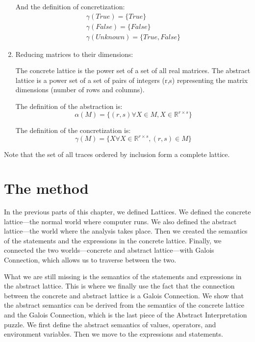 \begin{enumerate}
    And the definition of concretization:
    \begin{gather*}
        \gamma(True) = \{True\}\\
        \gamma(False) = \{False\}\\
        \gamma(Unknown) = \{True, False\}
    \end{gather*}

    \item Reducing matrices to their dimensions:

    The concrete lattice is the power set of a set of all real matrices.
    The abstract lattice is a power set of a set of pairs of integers (r,s) representing the matrix dimensions (number
    of rows and columns).

    The definition of the abstraction is:
    \[\alpha(M) = \{(r, s) \forall X \in M, X \in \mathbb{R}^{r \times s}\}\]

    The definition of the concretization is:
    \[\gamma(M) = \{X \forall X \in \mathbb{R}^{r \times s}, (r,s) \in M\}\]
\end{enumerate}

Note that the set of all traces ordered by inclusion form a complete lattice.

\section{The method} %

In the previous parts of this chapter, we defined Lattices.
We defined the concrete lattice---the normal world where computer runs.
We also defined the abstract lattice---the world where the analysis takes place.
Then we created the semantics of the statements and the expressions in the concrete lattice.
Finally, we connected the two worlds---concrete and abstract lattice---with Galois Connection, which allows us to
traverse between the two.

What we are still missing is the semantics of the statements and expressions in the abstract lattice.
This is where we finally use the fact that the connection between the concrete and abstract lattice is a Galois
Connection.
We show that the abstract semantics can be derived from the semantics of the concrete lattice and the Galois Connection,
which is the last piece of the Abstract Interpretation puzzle.
We first define the abstract semantics of values, operators, and environment variables.
Then we move to the expressions and statements.

